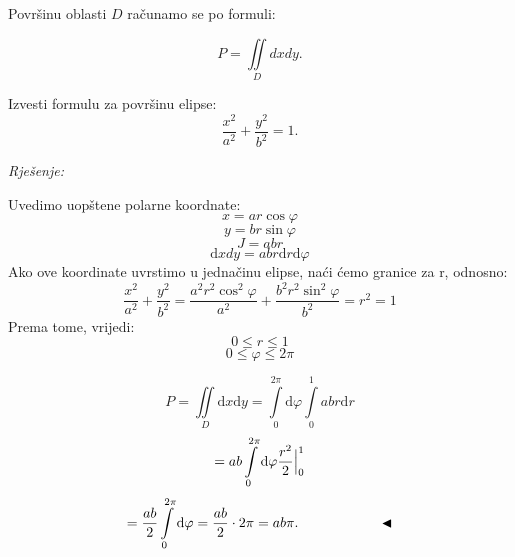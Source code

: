 \documentclass[a4paper,11pt]{article}
\begin{document}
\pagecolor{white}
\color{black}







\begin{center}
\end{center}
\begin{tcolorbox}[enhanced,attach boxed title to top center={yshift=-3mm,yshifttext=-1mm},
  colback=yellow!15!white,colframe=red!755!yellow,colbacktitle=brown!90!white,
  title=Površina,fonttitle=\bfseries,
  boxed title style={size=small,colframe=red!50!black} ]
    Površinu oblasti $D$  računamo se po formuli:

$$ P=\iint\limits_D dx dy.$$ 	   


\end{tcolorbox}
\begin{tcolorbox}[colback=brown!35!white,colframe=white!75!white,title= $$\bullet \bullet \bullet$$]
         \begin{zadatak}
Izvesti formulu za površinu elipse:
$$\frac{x^{2}}{a^{2}} + \frac{y^{2}}{b^{2}} = 1.$$
\end{zadatak}
\end{tcolorbox}
\emph{Rješenje: }
\begin{center}
\end{center}
Uvedimo uopštene polarne koordnate:
$$x = a r \cos{\varphi}$$
$$y = br \sin{\varphi}$$
$$J = abr$$
 $$\mathrm dxdy =ab r  \mathrm d r  \mathrm d\varphi$$
 Ako ove koordinate uvrstimo u jednačinu elipse, naći ćemo granice za r, odnosno:
 $$\frac{x^{2}}{a^{2}} + \frac{y^{2}}{b^{2}} = \frac{a^{2} r^{2}\cos^{2}{\varphi}}{a^{2}}  + \frac{ b^{2}r^{2} \sin^{2}{\varphi}}{b^{2}} = r^2 =1 $$
 Prema tome, vrijedi:
 $$0\leq r \leq 1$$
  $$0\leq \varphi \leq 2\pi$$
 

$$P = \iint \limits_{D}   \mathrm dx \mathrm dy = \int\limits_{0}^{2\pi} \mathrm d \varphi  \int\limits_{0}^{1}ab r\mathrm dr$$ 
$$= ab\int\limits_{0}^{2\pi} \mathrm d \varphi   \frac{r^{2}}{2}\Big{|}_{0}^{1} $$
$$ = \frac{ab}{2}\int\limits_{0}^{2\pi} \mathrm d \varphi   = \frac{ab}{2} \cdot 2\pi = ab\pi.\hskip 2 cm \blacktriangleleft  $$
\end{document}
